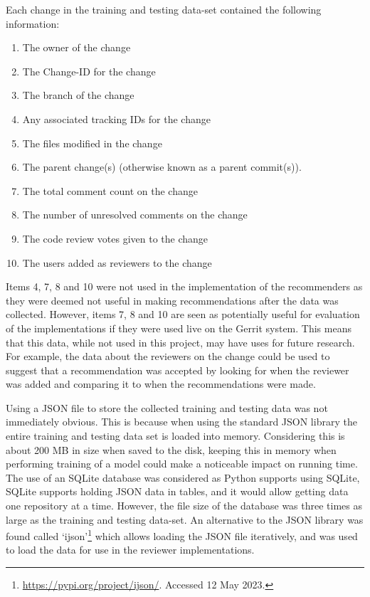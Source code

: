 \label{para:information-in-each-change-for-testing-data-set}Each change in the training and testing data-set contained the following information:
\begin{enumerate}
    \item The owner of the change
    \item The Change-ID for the change
    \item The branch of the change
    \item Any associated tracking IDs for the change
    \item The files modified in the change
    \item The parent change(s) (otherwise known as a parent commit(s)).
    \item The total comment count on the change
    \item The number of unresolved comments on the change
    \item The code review votes given to the change
    \item The users added as reviewers to the change
\end{enumerate}

Items 4, 7, 8 and 10 were not used in the implementation of the recommenders as they were deemed not useful in making recommendations after the data was collected. However, items 7, 8 and 10 are seen as potentially useful for evaluation of the implementations if they were used live on the Gerrit system. This means that this data, while not used in this project, may have uses for future research. For example, the data about the reviewers on the change could be used to suggest that a recommendation was accepted by looking for when the reviewer was added and comparing it to when the recommendations were made.

Using a JSON file to store the collected training and testing data was not immediately obvious. This is because when using the standard JSON library the entire training and testing data set is loaded into memory. Considering this is about 200 MB in size when saved to the disk, keeping this in memory when performing training of a model could make a noticeable impact on running time. The use of an SQLite database was considered as Python supports using SQLite, SQLite supports holding JSON data in tables, and it would allow getting data one repository at a time. However, the file size of the database was three times as large as the training and testing data-set. An alternative to the JSON library was found called `ijson'\footnote{\url{https://pypi.org/project/ijson/}. Accessed 12 May 2023.} which allows loading the JSON file iteratively, and was used to load the data for use in the reviewer implementations.

